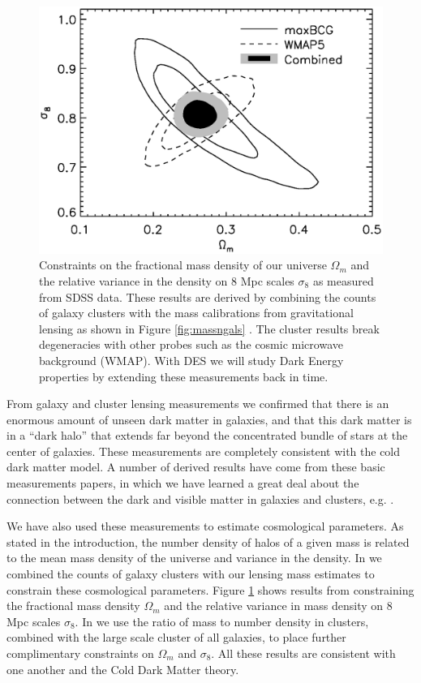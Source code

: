 \documentclass[12pt]{article}
\begin{document}
\begin{figure}[p] 
\centering 
\includegraphics[scale=0.6]{s8_Om.ps}

\caption{Constraints on the fractional mass density of our universe $\Omega_m$
and the relative variance in the density on 8 Mpc scales $\sigma_8$ as measured
from SDSS data.  These results \cite{RozoCosmo09} are derived by combining the
counts of galaxy clusters with the mass calibrations from gravitational lensing
as shown in Figure \ref{fig:massngals}
\cite{SheldonLensing07,JohnstonLensing07}.  The cluster results break
degeneracies with other probes such as the cosmic microwave background (WMAP).
With DES we will study Dark Energy properties by extending these measurements
back in time.  \label{fig:omegasigma8}} \end{figure}



From galaxy and cluster lensing measurements we confirmed that there is an
enormous amount of unseen dark matter in galaxies, and that this dark matter is
in a ``dark halo'' that extends far beyond the concentrated bundle of stars at
the center of galaxies.  These measurements are completely consistent with the
cold dark matter model.  A number of derived results have come from these basic
measurements papers, in which we have learned a great deal about the connection
between the dark and visible matter in galaxies and clusters, e.g.
\cite{RykoffLXM08,RozoScatter09,TinkerM2N2011}. 

We have also used these measurements to estimate cosmological parameters.  As
stated in the introduction, the number density of halos of a given mass is
related to the mean mass density of the universe and variance in the density.
In \cite{RozoCosmo09} we combined the counts of galaxy clusters with our
lensing mass estimates to constrain these cosmological parameters.  Figure
\ref{fig:omegasigma8} shows results from \cite{RozoCosmo09} constraining the
fractional mass density $\Omega_m$ and the relative variance in mass density on
8 Mpc scales $\sigma_8$.  In \cite{TinkerM2N2011} we use the ratio of mass to
number density in clusters, combined with the large scale cluster of all
galaxies, to place further complimentary constraints on $\Omega_m$ and
$\sigma_8$.  All these results are consistent with one another and the Cold
Dark Matter theory.
\end{document}
